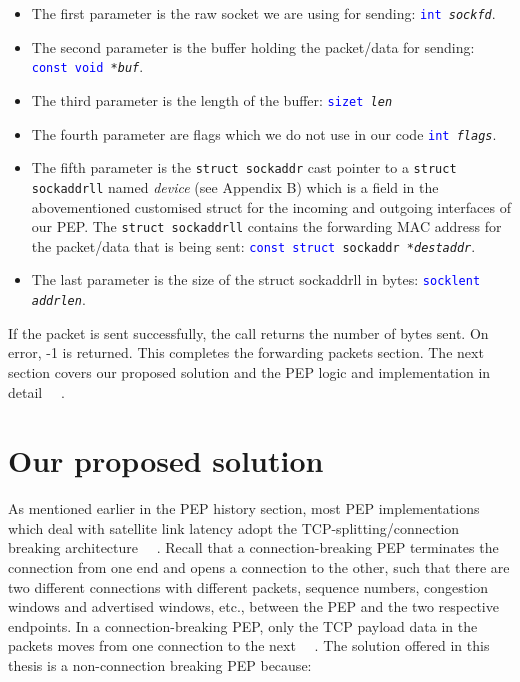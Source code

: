 \begin{itemize}
\item The first parameter is the raw socket we are using for sending: {\tt \textcolor{blue}{int} \emph{sockfd}}.
\item The second parameter is the buffer holding the packet/data for sending: {\tt  \textcolor{blue}{const void} \emph{*buf}}.
\item The third parameter is the length of the buffer: {\tt  \textcolor{blue}{size\textunderscore t} \emph{len}}
\item The fourth parameter are flags which we do not use in our code {\tt  \textcolor{blue}{int} \emph{flags}}.
\item The fifth parameter is the {\tt struct sockaddr} cast pointer to a {\tt struct sockaddr\textunderscore ll} named \emph{device} (see Appendix B) which is a field in the abovementioned customised struct for the incoming and outgoing interfaces of our PEP. The {\tt struct sockaddr\textunderscore ll} contains the forwarding MAC address for the packet/data that is being sent: {\tt  \textcolor{blue}{const struct} sockaddr \emph{*dest\textunderscore addr}}.
\item The last parameter is the size of the struct sockaddr\textunderscore ll in bytes: {\tt  \textcolor{blue}{socklen\textunderscore t} \emph{addrlen}}.\\
\end{itemize}

If the packet is sent successfully, the call returns the number of bytes sent. On error, -1 is returned. This completes the forwarding packets section. The next section covers our proposed solution and the PEP logic and implementation in detail ~\cite{35}~\cite{38}.

\section{Our proposed solution}

As mentioned earlier in the PEP history section, most PEP implementations which deal with satellite link latency adopt the TCP-splitting/connection breaking architecture ~\cite{6}~\cite{14}. Recall that a connection-breaking PEP terminates the connection from one end and opens a connection to the other, such that there are two different connections with different packets, sequence numbers, congestion windows and advertised windows, etc., between the PEP and the two respective endpoints. In a connection-breaking PEP, only the TCP payload data in the packets moves from one connection to the next ~\cite{6}~\cite{14}. The solution offered in this thesis is a non-connection breaking PEP because:\\

